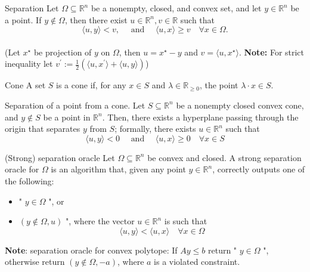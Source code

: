 
\begin{theorem}[L5.1]{Separation}
    Let $\Omega \subseteq \mathbb{R}^n$ be a nonempty, closed, and convex set, and let $y \in \mathbb{R}^n$ be a point. If $y \notin \Omega$, then there exist $u \in \mathbb{R}^n, v \in \mathbb{R}$ such that
    \vspace{-4pt}\\
    $$
    \langle u, y\rangle<v, \quad \text { and } \quad\langle u, x\rangle \geq v \quad \forall x \in \Omega .
    $$
    \vspace{-4pt}\\
    (Let $x^\star$ be projection of $y$ on $\Omega$, then $u = x^\star - y$ and $v = \langle u, x^\star\rangle$. \textbf{Note:} For strict inequality let $v^\prime:=\frac{1}{2}(\langle u, x^\prime \rangle + \langle u, y \rangle)$)\\
\end{theorem}

\begin{definition}[L5.1]{Cone}
    A set $S$ is a cone if, for any $x \in S$ and $\lambda \in \mathbb{R}_{\geq 0}$, the point $\lambda \cdot x \in S$.
\end{definition}

\begin{theorem}[L5.2]{Separation of a point from a cone.}
    Let $S \subseteq \mathbb{R}^n$ be a nonempty closed convex cone, and $y \notin S$ be a point in $\mathbb{R}^n$. Then, there exists a hyperplane passing through the origin that separates $y$ from $S$; formally, there exists $u \in \mathbb{R}^n$ such that
    \vspace{-4pt}\\
    $$
    \langle u, y\rangle<0 \quad \text { and } \quad\langle u, x\rangle \geq 0 \quad \forall x \in S
    $$
    \vspace{-8pt}
\end{theorem}

\begin{definition}[L5.2]{(Strong) separation oracle}
    Let $\Omega \subseteq \mathbb{R}^n$ be convex and closed. A strong separation oracle for $\Omega$ is an algorithm that, given any point $y \in \mathbb{R}^n$, correctly outputs one of the following:
    \begin{itemize}[leftmargin=*]
        \item " $y \in \Omega$ ", or
        \item $(y \notin \Omega, u)$ ", where the vector $u \in \mathbb{R}^n$ is such that
        \vspace{-5pt}\\
        $$
        \langle u, y\rangle<\langle u, x\rangle \quad \forall x \in \Omega
        $$
        \vspace{-8pt}
    \end{itemize}
    \textbf{Note}: separation oracle for convex polytope: If $Ay \leq b$ return " $y \in \Omega$ ", otherwise return $(y \notin \Omega, -a)$, where $a$ is a violated constraint.
\end{definition}

